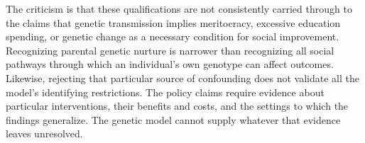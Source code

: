 The criticism is that these qualifications are not consistently carried
through to the claims that genetic transmission implies meritocracy,
excessive education spending, or genetic change as a necessary condition
for social improvement. Recognizing parental genetic nurture is narrower
than recognizing all social pathways through which an individual's own
genotype can affect outcomes. Likewise, rejecting that particular source
of confounding does not validate all the model's identifying restrictions.
The policy claims require evidence about particular interventions, their
benefits and costs, and the settings to which the findings generalize.
The genetic model cannot supply whatever that evidence leaves unresolved.
